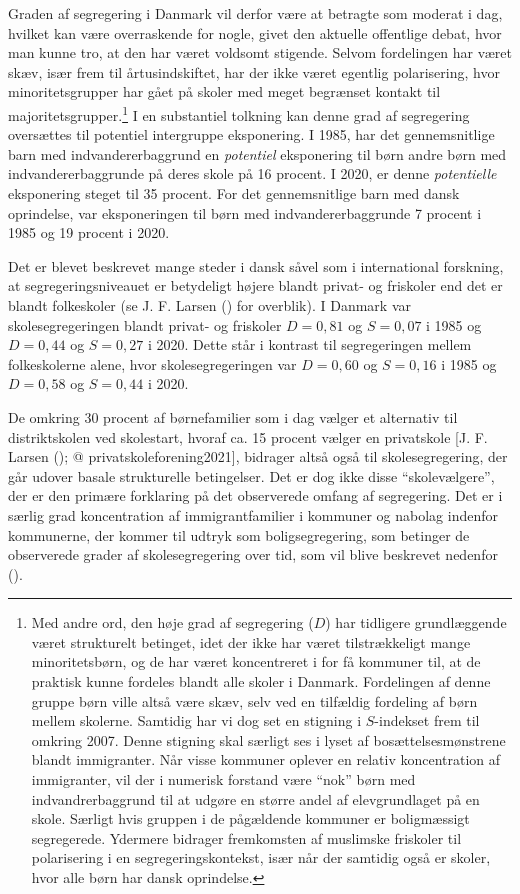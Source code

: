 \documentclass[
]{book}
\begin{document}
Graden af segregering i Danmark vil derfor være at betragte som moderat i dag, hvilket kan være overraskende for nogle, givet den aktuelle offentlige debat, hvor man kunne tro, at den har været voldsomt stigende. Selvom fordelingen har været skæv, især frem til årtusindskiftet, har der ikke været egentlig polarisering, hvor minoritetsgrupper har gået på skoler med meget begrænset kontakt til majoritetsgrupper.\footnote{Med andre ord, den høje grad af segregering (\(D\)) har tidligere grundlæggende været strukturelt betinget, idet der ikke har været tilstrækkeligt mange minoritetsbørn, og de har været koncentreret i for få kommuner til, at de praktisk kunne fordeles blandt alle skoler i Danmark. Fordelingen af denne gruppe børn ville altså være skæv, selv ved en tilfældig fordeling af børn mellem skolerne. Samtidig har vi dog set en stigning i \(S\)-indekset frem til omkring 2007. Denne stigning skal særligt ses i lyset af bosættelsesmønstrene blandt immigranter. Når visse kommuner oplever en relativ koncentration af immigranter, vil der i numerisk forstand være ``nok'' børn med indvandrerbaggrund til at udgøre en større andel af elevgrundlaget på en skole. Særligt hvis gruppen i de pågældende kommuner er boligmæssigt segregerede. Ydermere bidrager fremkomsten af muslimske friskoler til polarisering i en segregeringskontekst, især når der samtidig også er skoler, hvor alle børn har dansk oprindelse.} I en substantiel tolkning kan denne grad af segregering oversættes til potentiel intergruppe eksponering. I 1985, har det gennemsnitlige barn med indvandererbaggrund en \emph{potentiel} eksponering til børn andre børn med indvandererbaggrunde på deres skole på 16 procent. I 2020, er denne \emph{potentielle} eksponering steget til 35 procent. For det gennemsnitlige barn med dansk oprindelse, var eksponeringen til børn med indvandererbaggrunde 7 procent i 1985 og 19 procent i 2020.

Det er blevet beskrevet mange steder i dansk såvel som i international forskning, at segregeringsniveauet er betydeligt højere blandt privat- og friskoler end det er blandt folkeskoler (se J. F. Larsen () for overblik). I Danmark var skolesegregeringen blandt privat- og friskoler \(D=0,81\) og \(S=0,07\) i 1985 og \(D=0,44\) og \(S=0,27\) i 2020. Dette står i kontrast til segregeringen mellem folkeskolerne alene, hvor skolesegregeringen var \(D=0,60\) og \(S=0,16\) i 1985 og \(D=0,58\) og \(S=0,44\) i 2020.

De omkring 30 procent af børnefamilier som i dag vælger et alternativ til distriktskolen ved skolestart, hvoraf ca. 15 procent vælger en privatskole {[}J. F. Larsen (); @ privatskoleforening2021{]}, bidrager altså også til skolesegregering, der går udover basale strukturelle betingelser. Det er dog ikke disse ``skolevælgere'', der er den primære forklaring på det observerede omfang af segregering. Det er i særlig grad koncentration af immigrantfamilier i kommuner og nabolag indenfor kommunerne, der kommer til udtryk som boligsegregering, som betinger de observerede grader af skolesegregering over tid, som vil blive beskrevet nedenfor ().
\end{document}
